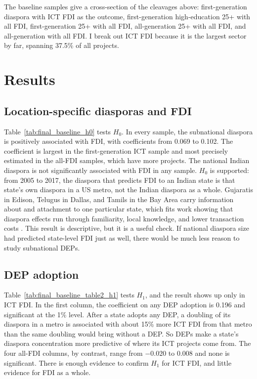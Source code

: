 \documentclass[12pt]{article}
\begin{document}
The baseline samples give a cross-section of the cleavages above: first-generation diaspora with ICT FDI as the outcome, first-generation high-education 25+ with all FDI, first-generation 25+ with all FDI, all-generation 25+ with all FDI, and all-generation with all FDI. I break out ICT FDI because it is the largest sector by far, spanning 37.5\% of all projects.

\section{Results} \label{sec:results}

\subsection{Location-specific diasporas and FDI}

Table~\ref{tab:final_baseline_h0} tests $H_0$. In every sample, the subnational diaspora is positively associated with FDI, with coefficients from 0.069 to 0.102. The coefficient is largest in the first-generation ICT sample and most precisely estimated in the all-FDI samples, which have more projects. The national Indian diaspora is not significantly associated with FDI in any sample. $H_0$ is supported: from 2005 to 2017, the diaspora that predicts FDI to an Indian state is that state's own diaspora in a US metro, not the Indian diaspora as a whole. Gujaratis in Edison, Telugus in Dallas, and Tamils in the Bay Area carry information about and attachment to one particular state, which fits work showing that diaspora effects run through familiarity, local knowledge, and lower transaction costs \citep{leblang_familiarity_2010, kugler_migration_2018, useche_highly_2020}. This result is descriptive, but it is a useful check. If national diaspora size had predicted state-level FDI just as well, there would be much less reason to study subnational DEPs.



\subsection{DEP adoption}

Table~\ref{tab:final_baseline_table2_h1} tests $H_1$, and the result shows up only in ICT FDI. In the first column, the coefficient on any DEP adoption is 0.196 and significant at the 1\% level. After a state adopts any DEP, a doubling of its diaspora in a metro is associated with about 15\% more ICT FDI from that metro than the same doubling would bring without a DEP. So DEPs make a state's diaspora concentration more predictive of where its ICT projects come from. The four all-FDI columns, by contrast, range from $-0.020$ to 0.008 and none is significant. There is enough evidence to confirm $H_1$ for ICT FDI, and little evidence for FDI as a whole.
\end{document}
